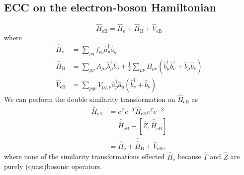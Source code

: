 \subsection{ECC on the electron-boson Hamiltonian}
\label{sec:ECC-GW}
 \begin{equation} \label{eq:HeB}
	\hat{H}_{\text{eB}} = \hat{H}_{\text{e}} + \hat{H}_{\text{B}} + \hat{V}_{\text{eB}}
\end{equation}
where 
\begin{align}
	\hat{H}_{\text{e}} 
	& = \sum_{pq} f_{pq} \hat{a}^\dagger_p \hat{a}_q
	\\
	\label{eq:HB}
	\hat{H}_{\text{B}}
	& = \sum_{\mu\nu} A_{\mu\nu} \hat{b}^\dagger_{\mu} \hat{b}_{\nu} 
	+ \frac{1}{2} \sum_{\mu\nu} B_{\mu\nu} \left( \hat{b}^\dagger_{\mu} \hat{b}^\dagger_{\nu} + \hat{b}_{\mu} \hat{b}_{\nu} \right)
	\\
	\hat{V}_{\text{eB}} 
	& = \sum_{pq\nu} V_{pq,\nu}  \hat{a}^\dagger_p \hat{a}_q \left( \hat{b}^\dagger_{\nu} + \hat{b}_{\nu} \right)
\end{align}
We can perform the double similarity transformation on $\hat{H}_{\mathrm{eB}}$ as
\begin{equation}
\begin{split}
	\bar{\bar{H}}_{\mathrm{eB}} 
	& = e^{\hat{Z}} e^{-\hat{T}} \hat{H}_{\mathrm{eB}} e^{\hat{T}} e^{-\hat{Z}}  
	\\
	& = \bar{\hat{H}}_{\mathrm{eB}} + [\hat{Z}, \bar{\hat{H}}_{\mathrm{eB}}]
	\\ 
	& = \hat{H}_{\mathrm{e}} + \bar{\bar{\hat{H}}}_{\mathrm{B}} + \bar{\bar{V}}_{\mathrm{eB}},
\end{split}
\end{equation}
where none of the similarity transformations effected $\hat{H}_{\mathrm{e}}$ because $\hat{T}$ and $\hat{Z}$ are purely (quasi)bosonic operators. 
